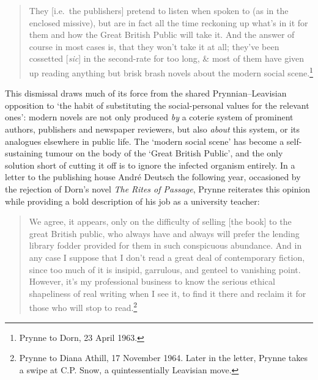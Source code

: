 \documentclass[]{article}
\begin{document}
\begin{quote}
\singlespacing They {[}i.e.~the publishers{]} pretend to listen when
spoken to (as in the enclosed missive), but are in fact all the time
reckoning up what’s in it for them and how the Great British Public will
take it. And the answer of course in most cases is, that they won’t take
it at all; they’ve been cossetted {[}\emph{sic}{]} in the second-rate
for too long, \& most of them have given up reading anything but brisk
brash novels about the modern social scene.\footnote{Prynne to Dorn, 23
  April 1963.}
\end{quote}

\noindent This dismissal draws much of its force from the shared
Prynnian–Leavisian opposition to ‘the habit of substituting the
social-personal values for the relevant ones’: modern novels are not
only produced \emph{by} a coterie system of prominent authors,
publishers and newspaper reviewers, but also \emph{about} this system,
or its analogues elsewhere in public life. The ‘modern social scene’ has
become a self-sustaining tumour on the body of the ‘Great British
Public’, and the only solution short of cutting it off is to ignore the
infected organism entirely. In a letter to the publishing house André
Deutsch the following year, occasioned by the rejection of Dorn’s novel
\emph{The Rites of Passage}, Prynne reiterates this opinion while
providing a bold description of his job as a university teacher:

\begin{quote}
\singlespacing We agree, it appears, only on the difficulty of selling
{[}the book{]} to the great British public, who always have and always
will prefer the lending library fodder provided for them in such
conspicuous abundance. And in any case I suppose that I don’t read a
great deal of contemporary fiction, since too much of it is insipid,
garrulous, and genteel to vanishing point. However, it’s my professional
business to know the serious ethical shapeliness of real writing when I
see it, to find it there and reclaim it for those who will stop to
read.\footnote{Prynne to Diana Athill, 17 November 1964. Later in the
  letter, Prynne takes a swipe at C.P. Snow, a quintessentially
  Leavisian move.}
\end{quote}
\end{document}
